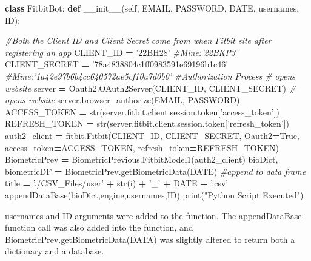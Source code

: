 \documentclass[]{book}
\newenvironment{Shaded}{\begin{snugshade}}{\end{snugshade}}
\newcommand{\KeywordTok}[1]{\textcolor[rgb]{0.13,0.29,0.53}{\textbf{#1}}}
\newcommand{\StringTok}[1]{\textcolor[rgb]{0.31,0.60,0.02}{#1}}
\newcommand{\CommentTok}[1]{\textcolor[rgb]{0.56,0.35,0.01}{\textit{#1}}}
\newcommand{\FunctionTok}[1]{\textcolor[rgb]{0.00,0.00,0.00}{#1}}
\newcommand{\VariableTok}[1]{\textcolor[rgb]{0.00,0.00,0.00}{#1}}
\newcommand{\OperatorTok}[1]{\textcolor[rgb]{0.81,0.36,0.00}{\textbf{#1}}}
\newcommand{\BuiltInTok}[1]{#1}
\newcommand{\NormalTok}[1]{#1}
\begin{document}
\begin{Shaded}
\begin{Highlighting}[]
\KeywordTok{class}\NormalTok{ FitbitBot:}
    \KeywordTok{def} \FunctionTok{__init__}\NormalTok{(}\VariableTok{self}\NormalTok{, EMAIL, PASSWORD, DATE, usernames, ID):}
 
        \CommentTok{#Both the Client ID and Client Secret come from when Fitbit site after registering an app}
\NormalTok{        CLIENT_ID }\OperatorTok{=} \StringTok{'22BH28'} \CommentTok{#Mine:'22BKP3'}
\NormalTok{        CLIENT_SECRET }\OperatorTok{=} \StringTok{'78a4838804c1ff0983591e69196b1c46'} \CommentTok{#Mine:'1a42e97b6b4cc640572ae5cf10a7d0b0'}
        \CommentTok{#Authorization Process}
        \CommentTok{# opens website}
\NormalTok{        server }\OperatorTok{=}\NormalTok{ Oauth2.OAuth2Server(CLIENT_ID, CLIENT_SECRET)}
        \CommentTok{# opens website}
\NormalTok{        server.browser_authorize(EMAIL, PASSWORD)}
\NormalTok{        ACCESS_TOKEN }\OperatorTok{=} \BuiltInTok{str}\NormalTok{(server.fitbit.client.session.token[}\StringTok{'access_token'}\NormalTok{])}
\NormalTok{        REFRESH_TOKEN }\OperatorTok{=} \BuiltInTok{str}\NormalTok{(server.fitbit.client.session.token[}\StringTok{'refresh_token'}\NormalTok{])}
\NormalTok{        auth2_client }\OperatorTok{=}\NormalTok{ fitbit.Fitbit(CLIENT_ID, CLIENT_SECRET, Oauth2}\OperatorTok{=}\VariableTok{True}\NormalTok{, access_token}\OperatorTok{=}\NormalTok{ACCESS_TOKEN,}
\NormalTok{        refresh_token}\OperatorTok{=}\NormalTok{REFRESH_TOKEN)}
\NormalTok{        BiometricPrev }\OperatorTok{=}\NormalTok{ BiometricPrevious.FitbitModel1(auth2_client)}
\NormalTok{        bioDict, biometricDF }\OperatorTok{=}\NormalTok{ BiometricPrev.getBiometricData(DATE) }\CommentTok{#append to data frame}
\NormalTok{        title }\OperatorTok{=} \StringTok{'./CSV_Files/user'} \OperatorTok{+} \BuiltInTok{str}\NormalTok{(i) }\OperatorTok{+} \StringTok{'_'} \OperatorTok{+}\NormalTok{ DATE }\OperatorTok{+} \StringTok{'.csv'}
\NormalTok{        appendDataBase(bioDict,engine,usernames,ID)}
        \BuiltInTok{print}\NormalTok{(}\StringTok{"Python Script Executed"}\NormalTok{)}
\end{Highlighting}
\end{Shaded}

usernames and ID arguments were added to the function. The
appendDataBase function call was also added into the function, and
BiometricPrev.getBiometricData(DATA) was slightly altered to return both
a dictionary and a database.
\end{document}

